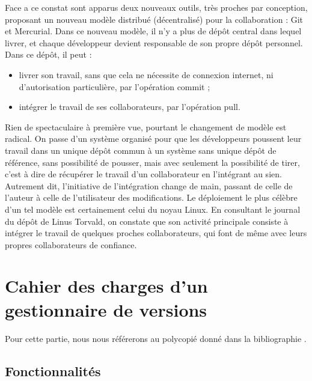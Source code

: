 Face a ce constat sont apparus deux nouveaux outils, très proches par conception, proposant un nouveau modèle distribué (décentralisé) pour la collaboration : Git et Mercurial. Dans ce nouveau modèle, il n'y a plus de dépôt central dans lequel livrer, et chaque développeur devient responsable de son propre dépôt personnel. Dans ce dépôt, il peut :
\begin{itemize}
\item livrer son travail, sans que cela ne nécessite de connexion internet, ni d'autorisation particulière, par l'opération commit ;
\item intégrer le travail de ses collaborateurs, par l'opération pull.
\end{itemize}

Rien de spectaculaire à première vue, pourtant le changement de modèle est radical. On passe d'un système organisé pour que les développeurs poussent leur travail dans un unique dépôt commun à un système sans unique dépôt de référence, sans possibilité de pousser, mais avec seulement la possibilité de tirer, c'est à dire de récupérer le travail d'un collaborateur en l'intégrant au sien. Autrement dit, l'initiative de l'intégration change de main, passant de celle de l'auteur à celle de l'utilisateur des modifications. Le déploiement le plus célèbre d'un tel modèle est certainement celui du noyau Linux. En consultant le journal du dépôt de Linus Torvald, on constate que son activité principale consiste à intégrer le travail de quelques proches collaborateurs, qui font de même avec leurs propres collaborateurs de confiance.

\section{Cahier des charges d'un gestionnaire de versions}



Pour cette partie, nous nous référerons au polycopié donné dans la bibliographie \cite{Git-poly}. 

\subsection{Fonctionnalités}

